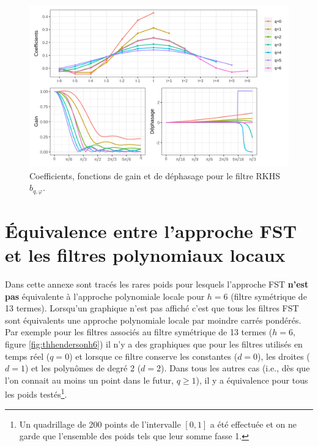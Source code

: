 \documentclass[
  12pt,
  a4paper,french]{article}
\newcommand\1{\mathds{1}}
\begin{document}
\begin{figure}[H]

{\centering \includegraphics[width=1\linewidth]{img/filters_used/phase} 

}

\caption[Coefficients, fonctions de gain et de déphasage pour le filtre RKHS \(b_{q,\varphi}\)]{Coefficients, fonctions de gain et de déphasage pour le filtre RKHS \(b_{q,\varphi}\).}\label{fig:graphsrkhsphase}

\footnotesize
\normalsize\end{figure}

\newpage

\hypertarget{an-equivfstlp}{%
\section{Équivalence entre l'approche FST et les filtres polynomiaux locaux}\label{an-equivfstlp}}

Dans cette annexe sont tracés les rares poids pour lesquels l'approche FST \textbf{n'est pas} équivalente à l'approche polynomiale locale pour \(h=6\) (filtre symétrique de 13 termes).
Lorsqu'un graphique n'est pas affiché c'est que tous les filtres FST sont équivalents une approche polynomiale locale par moindre carrés pondérés.
Par exemple pour les filtres associés au filtre symétrique de 13 termes (\(h=6\), figure \ref{fig:thhendersonh6}) il n'y a des graphiques que pour les filtres utilisés en temps réel (\(q=0\)) et lorsque ce filtre conserve les constantes (\(d=0\)), les droites (\(d=1\)) et les polynômes de degré 2 (\(d=2\)).
Dans tous les autres cas (i.e., dès que l'on connait au moins un point dans le futur, \(q\geq 1\)), il y a équivalence pour tous les poids testés\footnote{
  Un quadrillage de 200 points de l'intervalle \([0,1]\) a été effectuée et on ne garde que l'ensemble des poids tels que leur somme fasse 1.}.
\end{document}

